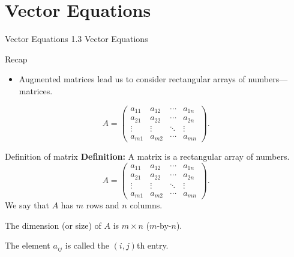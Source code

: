 
\section{Vector Equations}
\begin{frame}{Vector Equations}
  \centering
  \Large 1.3 Vector Equations

  \medskip
\end{frame}

\begin{frame}{Recap}
  \begin{itemize}
    \item Augmented matrices lead us to consider rectangular arrays of
          numbers---matrices.
  \end{itemize}
  \[
    A=
    \begin{pmatrix}
      a_{11} & a_{12} & \cdots & a_{1n}\\
      a_{21} & a_{22} & \cdots & a_{2n}\\
      \vdots & \vdots & \ddots & \vdots\\
      a_{m1} & a_{m2} & \cdots & a_{mn}
    \end{pmatrix}.
  \]
\end{frame}

\begin{frame}{Definition of matrix}
  \textbf{Definition:} A \alert{matrix} is a rectangular array of numbers.
  \[
    A=
    \begin{pmatrix}
      a_{11} & a_{12} & \cdots & a_{1n}\\
      a_{21} & a_{22} & \cdots & a_{2n}\\
      \vdots & \vdots & \ddots & \vdots\\
      a_{m1} & a_{m2} & \cdots & a_{mn}
    \end{pmatrix}.
  \]
  We say that $A$ has $m$ rows and $n$ columns. 
  
  The \alert{dimension}
  (or \alert{size}) of $A$ is $m\times n$ ($m$-by-$n$). 
  
  The element
  $a_{ij}$ is called the $(i,j)$th entry.
\end{frame}


